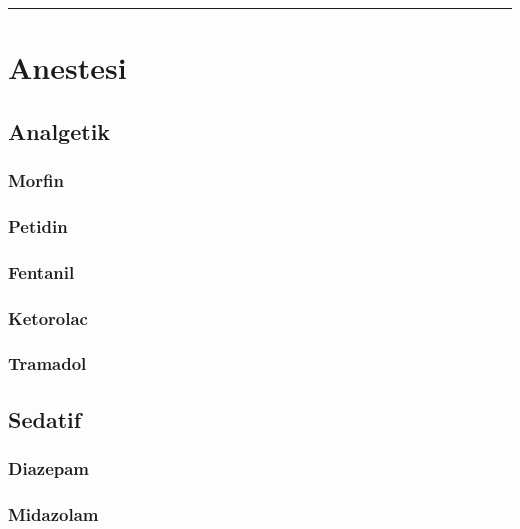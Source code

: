 \documentclass[
]{book}
\begin{document}
\begin{center}\rule{0.5\linewidth}{0.5pt}\end{center}

\hypertarget{anestesi-2}{%
\section{Anestesi}\label{anestesi-2}}

\hypertarget{analgetik}{%
\subsection{Analgetik}\label{analgetik}}

\hypertarget{morfin}{%
\subsubsection{Morfin}\label{morfin}}

\hypertarget{petidin}{%
\subsubsection{Petidin}\label{petidin}}

\hypertarget{fentanil}{%
\subsubsection{Fentanil}\label{fentanil}}

\hypertarget{ketorolac}{%
\subsubsection{Ketorolac}\label{ketorolac}}

\hypertarget{tramadol}{%
\subsubsection{Tramadol}\label{tramadol}}

\hypertarget{sedatif}{%
\subsection{Sedatif}\label{sedatif}}

\hypertarget{diazepam}{%
\subsubsection{Diazepam}\label{diazepam}}

\hypertarget{midazolam}{%
\subsubsection{Midazolam}\label{midazolam}}
\end{document}
